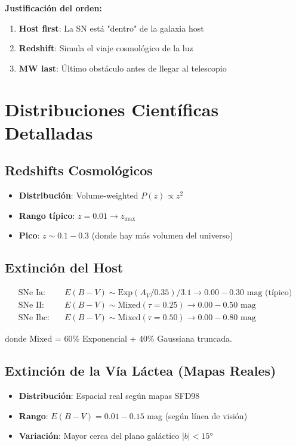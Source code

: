 \documentclass[11pt,a4paper]{article}
\begin{document}
\textbf{Justificación del orden:}
\begin{enumerate}
    \item \textbf{Host first}: La SN está "dentro" de la galaxia host
    \item \textbf{Redshift}: Simula el viaje cosmológico de la luz
    \item \textbf{MW last}: Último obstáculo antes de llegar al telescopio
\end{enumerate}

\section{Distribuciones Científicas Detalladas}

\subsection{Redshifts Cosmológicos}
\begin{itemize}
    \item \textbf{Distribución}: Volume-weighted $P(z) \propto z^2$
    \item \textbf{Rango típico}: $z = 0.01 \rightarrow z_{\max}$
    \item \textbf{Pico}: $z \sim 0.1-0.3$ (donde hay más volumen del universo)
\end{itemize}

\subsection{Extinción del Host}
\begin{align}
\text{SNe Ia:} \quad &E(B-V) \sim \text{Exp}(A_V/0.35)/3.1 \rightarrow 0.00-0.30 \text{ mag (típico)} \\
\text{SNe II:} \quad &E(B-V) \sim \text{Mixed}(\tau=0.25) \rightarrow 0.00-0.50 \text{ mag} \\
\text{SNe Ibc:} \quad &E(B-V) \sim \text{Mixed}(\tau=0.50) \rightarrow 0.00-0.80 \text{ mag}
\end{align}

donde Mixed = 60\% Exponencial + 40\% Gaussiana truncada.

\subsection{Extinción de la Vía Láctea (Mapas Reales)}

\begin{itemize}
    \item \textbf{Distribución}: Espacial real según mapas SFD98
    \item \textbf{Rango}: $E(B-V) = 0.01-0.15$ mag (según línea de visión)
    \item \textbf{Variación}: Mayor cerca del plano galáctico $|b| < 15°$
\end{itemize}
\end{document}
